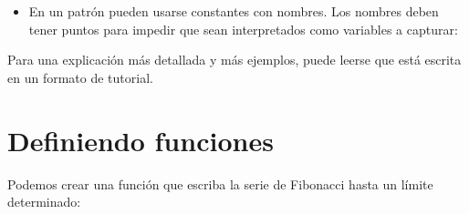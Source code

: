 \documentclass[a5paper,10pt,spanish]{sphinxmanual}
\begin{document}
\begin{itemize}
\item {} 
\sphinxAtStartPar
En un patrón pueden usarse constantes con nombres. Los nombres deben tener puntos para impedir que sean interpretados como variables a capturar:

\begin{sphinxVerbatim}[commandchars=\\\{\}]
   
 
      
      
      

 
     
     
     
\end{sphinxVerbatim}

\end{itemize}

\sphinxAtStartPar
Para una explicación más detallada y más ejemplos, puede leerse  que está escrita en un formato de tutorial.


\section{Definiendo funciones}
\label{\detokenize{tutorial/controlflow:defining-functions}}\label{\detokenize{tutorial/controlflow:tut-functions}}
\sphinxAtStartPar
Podemos crear una función que escriba la serie de Fibonacci hasta un límite determinado:
\end{document}
